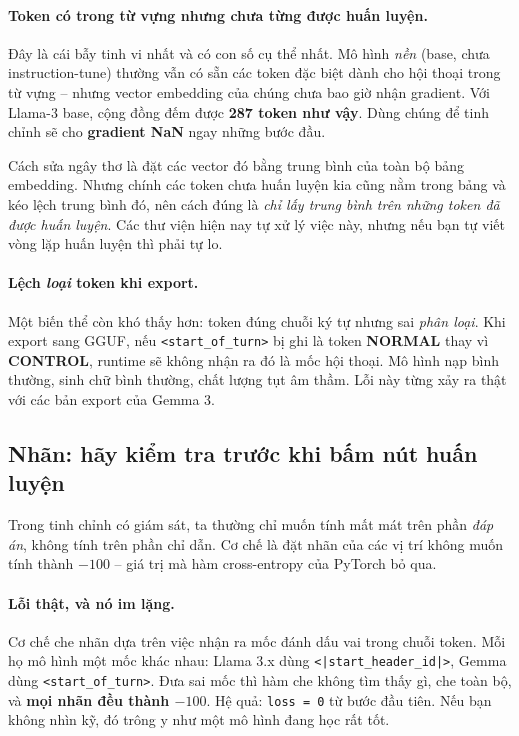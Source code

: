 \paragraph{Token có trong từ vựng nhưng chưa từng được huấn luyện.} Đây là cái bẫy tinh vi nhất và có con số cụ thể nhất. Mô hình \emph{nền} (base, chưa instruction-tune) thường vẫn có sẵn các token đặc biệt dành cho hội thoại trong từ vựng -- nhưng vector embedding của chúng chưa bao giờ nhận gradient. Với Llama-3 base, cộng đồng đếm được \textbf{287 token như vậy}. Dùng chúng để tinh chỉnh sẽ cho \textbf{gradient NaN} ngay những bước đầu.

Cách sửa ngây thơ là đặt các vector đó bằng trung bình của toàn bộ bảng embedding. Nhưng chính các token chưa huấn luyện kia cũng nằm trong bảng và kéo lệch trung bình đó, nên cách đúng là \emph{chỉ lấy trung bình trên những token đã được huấn luyện}. Các thư viện hiện nay tự xử lý việc này, nhưng nếu bạn tự viết vòng lặp huấn luyện thì phải tự lo.

\paragraph{Lệch \emph{loại} token khi export.} Một biến thể còn khó thấy hơn: token đúng chuỗi ký tự nhưng sai \emph{phân loại}. Khi export sang GGUF, nếu \texttt{<start\_of\_turn>} bị ghi là token \textbf{NORMAL} thay vì \textbf{CONTROL}, runtime sẽ không nhận ra đó là mốc hội thoại. Mô hình nạp bình thường, sinh chữ bình thường, chất lượng tụt âm thầm. Lỗi này từng xảy ra thật với các bản export của Gemma 3.

\subsection{Nhãn: hãy kiểm tra trước khi bấm nút huấn luyện}
\label{ssec:label_masking}

Trong tinh chỉnh có giám sát, ta thường chỉ muốn tính mất mát trên phần \emph{đáp án}, không tính trên phần chỉ dẫn. Cơ chế là đặt nhãn của các vị trí không muốn tính thành $-100$ -- giá trị mà hàm cross-entropy của PyTorch bỏ qua.

\paragraph{Lỗi thật, và nó im lặng.} Cơ chế che nhãn dựa trên việc nhận ra mốc đánh dấu vai trong chuỗi token. Mỗi họ mô hình một mốc khác nhau: Llama 3.x dùng \texttt{<|start\_header\_id|>}, Gemma dùng \texttt{<start\_of\_turn>}. Đưa sai mốc thì hàm che không tìm thấy gì, che toàn bộ, và \textbf{mọi nhãn đều thành $-100$}. Hệ quả: \texttt{loss = 0} từ bước đầu tiên. Nếu bạn không nhìn kỹ, đó trông y như một mô hình đang học rất tốt.


